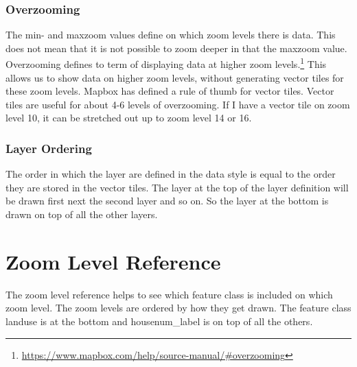 \subsubsection{Overzooming}\label{overzooming}
The min- and maxzoom values define on which zoom levels there is data. This does not mean that it is not possible to zoom deeper in that the maxzoom value.
Overzooming defines to term of displaying data at higher zoom levels.\footnote{\url{https://www.mapbox.com/help/source-manual/\#overzooming}}
This allows us to show data on higher zoom levels, without generating vector tiles for these zoom levels.
Mapbox has defined a rule of thumb for vector tiles. Vector tiles are useful for about 4-6 levels of overzooming. If I have a vector tile on zoom level 10, it can be stretched out up to zoom level 14 or 16.  

\subsubsection{Layer Ordering}\label{layer_ordering}
The order in which the layer are defined in the data style is equal to the order they are stored in the vector tiles.
The layer at the top of the layer definition will be drawn first next the second layer and so on. So the layer at the bottom is drawn on top of all the other layers.


\section{Zoom Level Reference}\label{zoomlevel_reference}
The zoom level reference helps to see which feature class is included on which zoom level. The zoom levels are ordered by how they get drawn. The feature class landuse is at the bottom and housenum\_label is on top of all the others. 

